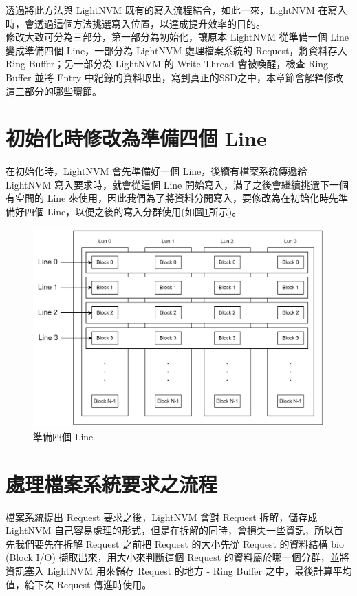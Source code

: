 透過將此方法與 LightNVM 既有的寫入流程結合，如此一來，LightNVM 在寫入時，會透過這個方法挑選寫入位置，以達成提升效率的目的。\\
\indent
修改大致可分為三部分，第一部分為初始化，讓原本 LightNVM 從準備一個 Line 變成準備四個 Line，一部分為 LightNVM 處理檔案系統的 Request，將資料存入 Ring Buffer；另一部分為 LightNVM 的 Write Thread 會被喚醒，檢查 Ring Buffer 並將 Entry 中紀錄的資料取出，寫到真正的SSD之中，本章節會解釋修改這三部分的哪些環節。

\section{初始化時修改為準備四個 Line}\label{s3.1}
\indent
在初始化時，LightNVM 會先準備好一個 Line，後續有檔案系統傳遞給 LightNVM 寫入要求時，就會從這個 Line 開始寫入，滿了之後會繼續挑選下一個有空間的 Line 來使用，因此我們為了將資料分開寫入，要修改為在初始化時先準備好四個 Line，以便之後的寫入分群使用(如圖\ref{f3.4}所示)。

\begin{figure}[H]
    \centering
    \includegraphics[width=1\textwidth]{picture/ch3/4Line.png}
    \caption{準備四個 Line}
    \label{f3.4}
\end{figure}

\newpage
\section{處理檔案系統要求之流程}\label{s3.2}
\indent
檔案系統提出 Request 要求之後，LightNVM 會對 Request 拆解，儲存成 LightNVM 自己容易處理的形式，但是在拆解的同時，會損失一些資訊，所以首先我們要先在拆解 Request 之前把 Request 的大小先從 Request 的資料結構 bio (Block I/O) \cite{10.1145/2619092}擷取出來，用大小來判斷這個 Request 的資料屬於哪一個分群，並將資訊塞入 LightNVM 用來儲存 Request 的地方 - Ring Buffer 之中，最後計算平均值，給下次 Request 傳進時使用。\cite{LightNVM}

